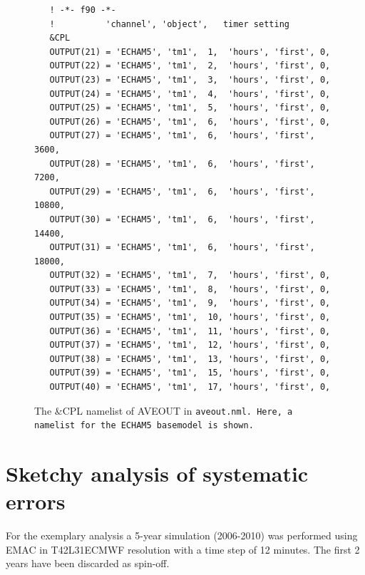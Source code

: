 \documentclass[twoside]{article}
\begin{document}
\begin{figure}
  \begin{center}
\begin{verbatim}
   ! -*- f90 -*-
   !          'channel', 'object',   timer setting
   &CPL
   OUTPUT(21) = 'ECHAM5', 'tm1',  1,  'hours', 'first', 0, 
   OUTPUT(22) = 'ECHAM5', 'tm1',  2,  'hours', 'first', 0, 
   OUTPUT(23) = 'ECHAM5', 'tm1',  3,  'hours', 'first', 0, 
   OUTPUT(24) = 'ECHAM5', 'tm1',  4,  'hours', 'first', 0, 
   OUTPUT(25) = 'ECHAM5', 'tm1',  5,  'hours', 'first', 0, 
   OUTPUT(26) = 'ECHAM5', 'tm1',  6,  'hours', 'first', 0, 
   OUTPUT(27) = 'ECHAM5', 'tm1',  6,  'hours', 'first', 3600, 
   OUTPUT(28) = 'ECHAM5', 'tm1',  6,  'hours', 'first', 7200, 
   OUTPUT(29) = 'ECHAM5', 'tm1',  6,  'hours', 'first', 10800, 
   OUTPUT(30) = 'ECHAM5', 'tm1',  6,  'hours', 'first', 14400, 
   OUTPUT(31) = 'ECHAM5', 'tm1',  6,  'hours', 'first', 18000, 
   OUTPUT(32) = 'ECHAM5', 'tm1',  7,  'hours', 'first', 0, 
   OUTPUT(33) = 'ECHAM5', 'tm1',  8,  'hours', 'first', 0, 
   OUTPUT(34) = 'ECHAM5', 'tm1',  9,  'hours', 'first', 0, 
   OUTPUT(35) = 'ECHAM5', 'tm1',  10, 'hours', 'first', 0, 
   OUTPUT(36) = 'ECHAM5', 'tm1',  11, 'hours', 'first', 0, 
   OUTPUT(37) = 'ECHAM5', 'tm1',  12, 'hours', 'first', 0, 
   OUTPUT(38) = 'ECHAM5', 'tm1',  13, 'hours', 'first', 0, 
   OUTPUT(39) = 'ECHAM5', 'tm1',  15, 'hours', 'first', 0, 
   OUTPUT(40) = 'ECHAM5', 'tm1',  17, 'hours', 'first', 0, 
\end{verbatim}
\end{center}
\caption{The \&CPL namelist of AVEOUT in \tt{aveout.nml}. Here, a namelist
  for the ECHAM5 basemodel is shown.\label{fig:nml}}
\end{figure}
\section{Sketchy analysis of systematic errors}
\label{sec:results}
For the exemplary analysis a 5-year simulation (2006-2010) was performed using
EMAC in T42L31ECMWF resolution with a time step of 12 minutes. The first 2
years have been discarded as spin-off.
\end{document}
